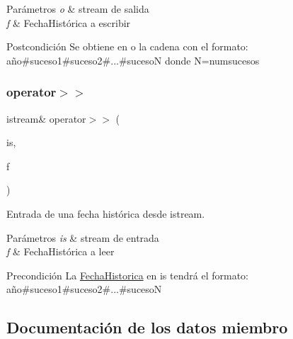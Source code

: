 \begin{DoxyParams}{Parámetros}
{\em o} & stream de salida \\
\hline
{\em f} & Fecha\+Histórica a escribir \\
\hline
\end{DoxyParams}
\begin{DoxyPostcond}{Postcondición}
Se obtiene en o la cadena con el formato\+: año\#suceso1\#suceso2\#...\#sucesoN donde N=numsucesos 
\end{DoxyPostcond}
\mbox{\label{classFechaHistorica_a25a93d162aadd3c52aa1f3d1831e3d75}} 
\subsubsection{\texorpdfstring{operator$>$$>$}{operator>>}}
{\footnotesize\ttfamily istream\& operator$>$$>$ (\begin{DoxyParamCaption}\item[{istream \&}]{is,  }\item[{\hyperlink{classFechaHistorica}{Fecha\+Historica} \&}]{f }\end{DoxyParamCaption})\hspace{0.3cm}{\ttfamily [friend]}}



Entrada de una fecha histórica desde istream. 


\begin{DoxyParams}{Parámetros}
{\em is} & stream de entrada \\
\hline
{\em f} & Fecha\+Histórica a leer \\
\hline
\end{DoxyParams}
\begin{DoxyPrecond}{Precondición}
La \hyperlink{classFechaHistorica}{Fecha\+Historica} en is tendrá el formato\+: año\#suceso1\#suceso2\#...\#sucesoN 
\end{DoxyPrecond}


\subsection{Documentación de los datos miembro}
\mbox{\label{classFechaHistorica_ade873215978862ec3ca4fcaa1fd33a07}} 
